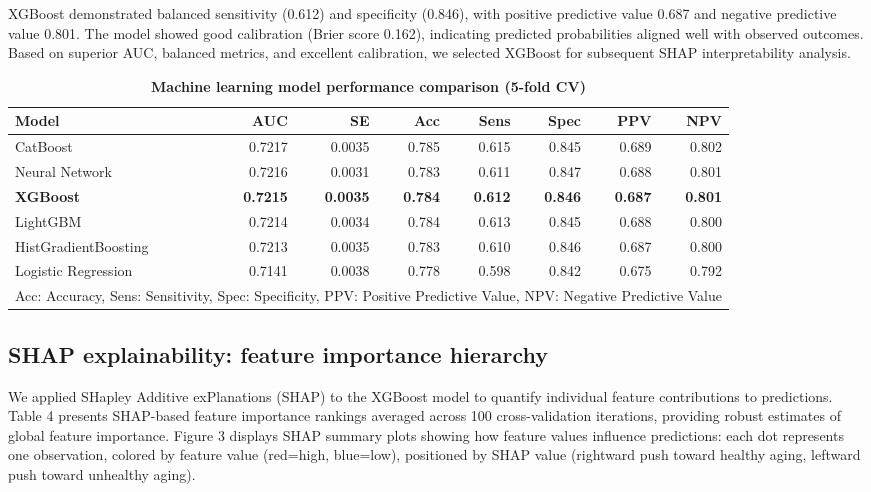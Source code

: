 \documentclass[10pt]{article}
\begin{document}
XGBoost demonstrated balanced sensitivity (0.612) and specificity (0.846), with positive predictive value 0.687 and negative predictive value 0.801. The model showed good calibration (Brier score 0.162), indicating predicted probabilities aligned well with observed outcomes. Based on superior AUC, balanced metrics, and excellent calibration, we selected XGBoost for subsequent SHAP interpretability analysis.

\begin{table}[h]
\centering
\caption{\textbf{Machine learning model performance comparison (5-fold CV)}}
\small
\begin{tabular}{lrrrrrrr}
\toprule
\textbf{Model} & \textbf{AUC} & \textbf{SE} & \textbf{Acc} & \textbf{Sens} & \textbf{Spec} & \textbf{PPV} & \textbf{NPV} \\
\midrule
CatBoost & 0.7217 & 0.0035 & 0.785 & 0.615 & 0.845 & 0.689 & 0.802 \\
Neural Network & 0.7216 & 0.0031 & 0.783 & 0.611 & 0.847 & 0.688 & 0.801 \\
\textbf{XGBoost} & \textbf{0.7215} & \textbf{0.0035} & \textbf{0.784} & \textbf{0.612} & \textbf{0.846} & \textbf{0.687} & \textbf{0.801} \\
LightGBM & 0.7214 & 0.0034 & 0.784 & 0.613 & 0.845 & 0.688 & 0.800 \\
HistGradientBoosting & 0.7213 & 0.0035 & 0.783 & 0.610 & 0.846 & 0.687 & 0.800 \\
Logistic Regression & 0.7141 & 0.0038 & 0.778 & 0.598 & 0.842 & 0.675 & 0.792 \\
\bottomrule
\multicolumn{8}{l}{\small Acc: Accuracy, Sens: Sensitivity, Spec: Specificity, PPV: Positive Predictive Value, NPV: Negative Predictive Value} \\
\end{tabular}
\end{table}

\subsection*{SHAP explainability: feature importance hierarchy}

We applied SHapley Additive exPlanations (SHAP) to the XGBoost model to quantify individual feature contributions to predictions. Table 4 presents SHAP-based feature importance rankings averaged across 100 cross-validation iterations, providing robust estimates of global feature importance. Figure 3 displays SHAP summary plots showing how feature values influence predictions: each dot represents one observation, colored by feature value (red=high, blue=low), positioned by SHAP value (rightward push toward healthy aging, leftward push toward unhealthy aging).
\end{document}
